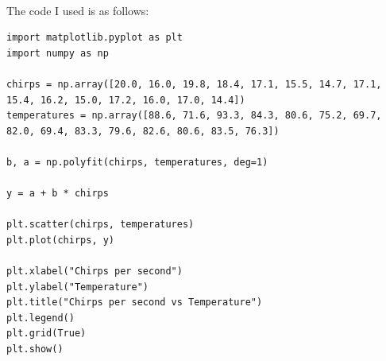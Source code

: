 \documentclass{article}
\begin{document}
{\begin{figure}[h!]
\end{figure}
\\
\\
\\ \\ \\ \\
The code I used is as follows:
\begin{verbatim}
import matplotlib.pyplot as plt
import numpy as np

chirps = np.array([20.0, 16.0, 19.8, 18.4, 17.1, 15.5, 14.7, 17.1, 15.4, 16.2, 15.0, 17.2, 16.0, 17.0, 14.4])
temperatures = np.array([88.6, 71.6, 93.3, 84.3, 80.6, 75.2, 69.7, 82.0, 69.4, 83.3, 79.6, 82.6, 80.6, 83.5, 76.3])

b, a = np.polyfit(chirps, temperatures, deg=1)

y = a + b * chirps 

plt.scatter(chirps, temperatures)
plt.plot(chirps, y)

plt.xlabel("Chirps per second")
plt.ylabel("Temperature")
plt.title("Chirps per second vs Temperature")
plt.legend()
plt.grid(True)
plt.show()\end{verbatim}

}
\end{document}
